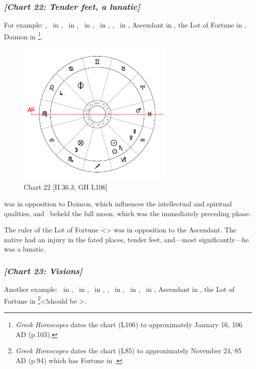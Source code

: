 \newpage
\subsubsection{\textit{[Chart 22: Tender feet, a lunatic]}}
For example: \Sun, \Saturn\, in \Capricorn, \Moon\, in \Scorpio, \Jupiter\, in \Leo, \Mars\, in \Pisces, \Venus, \Mercury\, in \Aquarius, Ascendant in \Virgo, the Lot of Fortune in \Scorpio, Daimon in \Cancer
\footnote{\textit{Greek Horoscopes} dates the chart (L106) to approximately January 16, 106 AD (p.103).}.

\clearpage
\begin{figure}
\centering
\vspace{-30pt}
\includegraphics[width=0.68\textwidth]{charts/2_36_3}
\caption{Chart 22 [II.36.3, GH L106]}
\label{fig:chart22}
\end{figure}

\noindent \Saturn was in opposition to Daimon, which influences the intellectual and spiritual qualities, and \Saturn\, beheld the full moon, which was the immediately preceding phase. 

The ruler of the Lot of Fortune <\Mars> was in opposition to the Ascendant. The native had an injury in the fated places, tender feet, and—most significantly—he was a lunatic. 

\newpage
\subsubsection{\textit{[Chart 23: Visions]}}
Another example: \Sun\, in \Sagittarius, \Moon\, in \Cancer, \Saturn\, in \Taurus, \Jupiter, \Mercury\, in \Scorpio, \Mars\, in \Leo, \Venus\, in \Capricorn, Ascendant in \Aquarius, the Lot of Fortune in \Leo\footnote{\textit{Greek Horoscopes} dates the chart (L85) to approximately November 24, 85 AD (p.94) which has Fortune in \Virgo.}<!should be \Virgo>.


